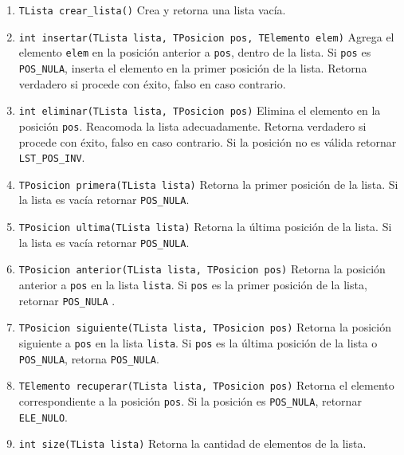 \documentclass[12pt,a4paper]{article}
\begin{document}
\begin{enumerate}
	
	\item \texttt{TLista crear\_lista()} Crea y retorna una lista vacía.
	
	\item \texttt{int insertar(TLista lista, TPosicion pos, TElemento elem)} Agrega el elemento \texttt{elem} en la posición anterior a \texttt{pos}, dentro de la lista. Si \texttt{pos} es \texttt{POS\_NULA}, inserta el elemento en la primer posición de la lista. Retorna verdadero si procede con éxito, falso en caso contrario.
	
	\item \texttt{int eliminar(TLista lista, TPosicion pos)} Elimina el elemento en la posición \texttt{pos}. Reacomoda la lista adecuadamente. Retorna verdadero si procede con éxito, falso en caso contrario. Si la posición no es válida retornar \texttt{LST\_POS\_INV}.
	
	\item \texttt{TPosicion primera(TLista lista)} Retorna la primer posición de la lista. Si la lista es vacía retornar \texttt{POS\_NULA}.
	
	\item \texttt{TPosicion ultima(TLista lista)} Retorna la última posición de la lista. Si la lista es vacía retornar \texttt{POS\_NULA}.
	
	\item \texttt{TPosicion anterior(TLista lista, TPosicion pos)} Retorna la posición anterior a \texttt{pos} en la lista \texttt{lista}. Si \texttt{pos} es la primer posición de la lista, retornar \texttt{POS\_NULA} .
	
	\item \texttt{TPosicion siguiente(TLista lista, TPosicion pos)} Retorna la posición siguiente a \texttt{pos} en la lista \texttt{lista}. Si \texttt{pos} es la última posición de la lista o \texttt{POS\_NULA}, retorna \texttt{POS\_NULA}.
	
	\item \texttt{TElemento recuperar(TLista lista, TPosicion pos)} Retorna el elemento correspondiente a la posición \texttt{pos}. Si la posición es \texttt{POS\_NULA}, retornar \texttt{ELE\_NULO}.

	\item \texttt{int size(TLista lista)} Retorna la cantidad de elementos de la lista.	
	
\end{enumerate}
\end{document}
